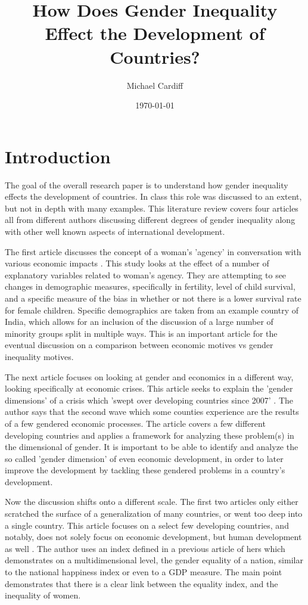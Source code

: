 \documentclass[12pt, letterpaper]{article}
\title{How Does Gender Inequality \\ Effect the Development of Countries?}
\author{Michael Cardiff}
\date{\today}
\begin{document}
\maketitle
\section*{Introduction}
The goal of the overall research paper is to understand how gender inequality effects the development of countries. In class this role was discussed to an extent, but not in depth with many examples. This literature review covers four articles all from different authors discussing different degrees of gender inequality along with other well known aspects of international development.

The first article discusses the concept of a woman's 'agency' in conversation with various economic impacts \cite{bhatt}. This study looks at the effect of a number of explanatory variables related to woman's agency. They are attempting to see changes in demographic measures, specifically in fertility, level of child survival, and a specific measure of the bias in whether or not there is a lower survival rate for female children. Specific demographics are taken from an example country of India, which allows for an inclusion of the discussion of a large number of minority groups split in multiple ways. This is an important article for the eventual discussion on a comparison between economic motives vs gender inequality motives.

The next article focuses on looking at gender and economics in a different way, looking specifically at economic crises. This article seeks to explain the 'gender dimensions' of a crisis which 'swept over developing countries since 2007' \cite{elson}. The author says that the second wave which some counties experience are the results of a few gendered economic processes. The article covers a few different developing countries and applies a framework for analyzing these problem(s) in the dimensional of gender. It is important to be able to identify and analyze the so called 'gender dimension' of even economic development, in order to later improve the development by tackling these gendered problems in a country's development.

Now the discussion shifts onto a different scale. The first two articles only either scratched the surface of a generalization of many countries, or went too deep into a single country. This article focuses on a select few developing countries, and notably, does not solely focus on economic development, but human development as well \cite{ferrant}. The author uses an index defined in a previous article of hers which demonstrates on a multidimensional level, the gender equality of a nation, similar to the national happiness index or even to a GDP measure. The main point demonstrates that there is a clear link between the equality index, and the inequality of women. 
\end{document}
